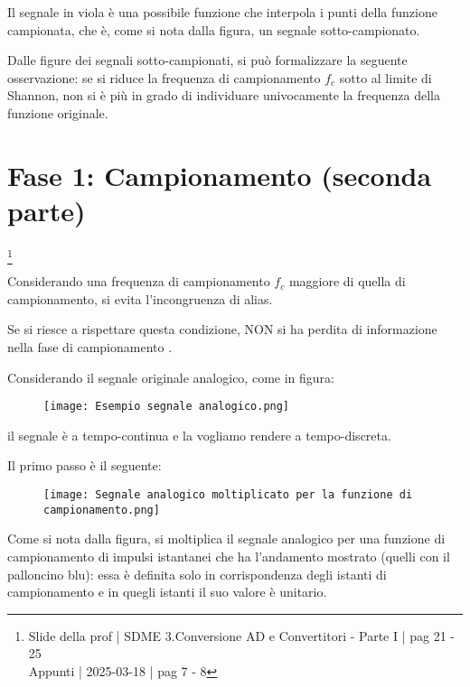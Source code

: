 Il segnale in viola è una possibile funzione che interpola i punti della funzione campionata, 
che è, come si nota dalla figura, un segnale sotto-campionato. \newline 

Dalle figure dei segnali sotto-campionati, si può formalizzare la seguente osservazione: 
se si riduce la frequenza di campionamento $f_c$ sotto al limite di Shannon, non si è più in grado di individuare univocamente 
la frequenza della funzione originale. \newline 

\newpage 

\section{Fase 1: Campionamento (seconda parte)}
\footnote{Slide della prof | SDME 3.Conversione AD e Convertitori - Parte I | pag 21 - 25 \\  
Appunti | 2025-03-18 | pag 7 - 8}

Considerando una frequenza di campionamento $f_c$ maggiore di quella di campionamento, 
si evita l'incongruenza di alias. \newline 

Se si riesce a rispettare questa condizione, 
NON si ha perdita di informazione nella fase di campionamento .\newline 

Considerando il segnale originale analogico, come in figura: 

\begin{figure}[h]
    \centering
    \texttt{[image: Esempio segnale analogico.png]}
\end{figure}

il segnale è a tempo-continua e la vogliamo rendere a tempo-discreta. \newline 

Il primo passo è il seguente: 

\begin{figure}[h]
    \centering
    \texttt{[image: Segnale analogico moltiplicato per la funzione di campionamento.png]}
\end{figure} 

Come si nota dalla figura, si moltiplica il segnale analogico per una funzione di campionamento di impulsi istantanei che ha l'andamento mostrato (quelli con il palloncino blu): 
essa è definita solo in corrispondenza degli istanti di campionamento e in quegli istanti il suo valore è unitario. \newline 

